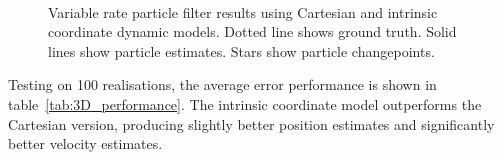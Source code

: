 \documentclass[conference]{IEEEtran}
\begin{document}
\begin{figure}
\centering
{}
\\
\caption{Variable rate particle filter results using Cartesian and intrinsic coordinate dynamic models. Dotted line shows ground truth. Solid lines show particle estimates. Stars show particle changepoints.}
\label{fig:3D_CartesianIntrinsic}
\end{figure}
%
Testing on 100 realisations, the average error performance is shown in table~\ref{tab:3D_performance}. The intrinsic coordinate model outperforms the Cartesian version, producing slightly better position estimates and significantly better velocity estimates.
%
\end{document}
